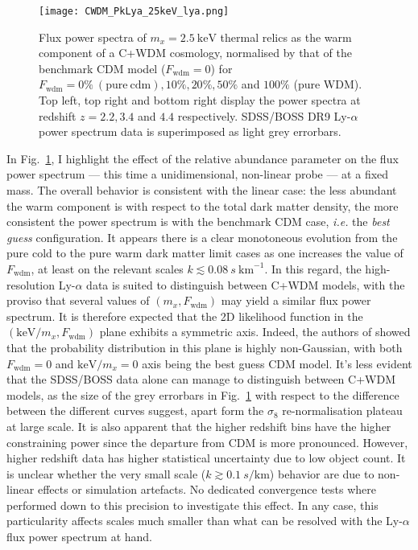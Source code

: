 \begin{figure}
\begin{center}
\texttt{[image: CWDM\_PkLya\_25keV\_lya.png]}
\caption{Flux power spectra of $m_x = 2.5~\mathrm{keV}$ thermal relics as the warm component of a C+WDM cosmology, normalised by that of the benchmark CDM model ($F_{\mathrm{wdm}} = 0$) for $F_{\mathrm{wdm}} = 0\%~ (\mathrm{pure ~cdm}), 10\%, 20\%, 50\%$ and $100\%$ (pure WDM). Top left, top right and bottom right display the power spectra at redshift $z=2.2, 3.4$ and $4.4$ respectively. SDSS/BOSS DR9 Ly-$\alpha$ power spectrum data is superimposed as light grey errorbars.}
\label{fig:cwdm_25keV}
\end{center}
\end{figure}

In Fig.~\ref{fig:cwdm_25keV}, I highlight the effect of the relative abundance parameter on the flux power spectrum --- this time a unidimensional, non-linear probe --- at a fixed mass. The overall behavior is consistent with the linear case: the less abundant the warm component is with respect to the total dark matter density, the more consistent the power spectrum is with the benchmark CDM case, \textit{i.e.} the \emph{best guess} configuration. It appears there is a clear monotoneous evolution from the pure cold to the pure warm dark matter limit cases as one increases the value of $F_{\mathrm{wdm}}$, at least on the relevant scales $k \lesssim 0.08~s~\mathrm{km}^{-1}$. In this regard, the high-resolution Ly-$\alpha$ data is suited to distinguish between C+WDM models, with the proviso that several values of $\left( m_x, F_{\mathrm{wdm}} \right)$ may yield a similar flux power spectrum. It is therefore expected that the 2D likelihood function in the $\left( \mathrm{keV}/m_x, F_{\mathrm{wdm}} \right)$ plane exhibits a symmetric axis. Indeed, the authors of \cite{BLR09} showed that the probability distribution in this plane is highly non-Gaussian, with both $F_{\mathrm{wdm}} = 0$ and $\mathrm{keV}/m_x = 0$ axis being the best guess CDM model. It's less evident that the SDSS/BOSS data alone can manage to distinguish between C+WDM models, as the size of the grey errorbars in Fig.~\ref{fig:cwdm_25keV} with respect to the difference between the different curves suggest, apart form the $\sigma_8$ re-normalisation plateau at large scale. It is also apparent that the higher redshift bins have the higher constraining power since the departure from CDM is more pronounced. However, higher redshift data has higher statistical uncertainty due to low object count. It is unclear whether the very small scale ($k \gtrsim 0.1~s/\mathrm{km}$) behavior are due to non-linear effects or simulation artefacts. No dedicated convergence tests where performed down to this precision to investigate this effect. In any case, this particularity affects scales much smaller than what can be resolved with the Ly-$\alpha$ flux power spectrum at hand. \\

